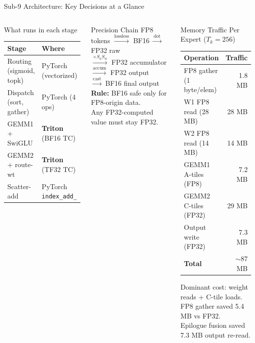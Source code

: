 \begin{frame}{Sub-9 Architecture: Key Decisions at a Glance}
\begin{columns}[T]
\begin{exampleblock}{What runs in each stage}
\small
\begin{tabular}{ll}
\toprule
\textbf{Stage} & \textbf{Where} \\
\midrule
Routing (sigmoid, topk) & PyTorch (vectorized) \\
Dispatch (sort, gather) & PyTorch (4 ops) \\
GEMM1 + SwiGLU & \textbf{Triton} (BF16 TC) \\
GEMM2 + route-wt & \textbf{Triton} (TF32 TC) \\
Scatter-add & PyTorch \texttt{index\_add\_} \\
\bottomrule
\end{tabular}
\end{exampleblock}

\begin{block}{\small Precision Chain}
\scriptsize
FP8 tokens $\xrightarrow{\text{lossless}}$ BF16 $\xrightarrow{\text{dot}}$ FP32 raw\\
$\xrightarrow{\times S_a S_w}$ FP32 accumulator\\
$\xrightarrow{\text{accum}}$ FP32 output\\
$\xrightarrow{\text{cast}}$ BF16 final output\\[3pt]
\textbf{Rule:} BF16 safe only for FP8-origin data.\\
Any FP32-computed value must stay FP32.
\end{block}

\begin{block}{\small Memory Traffic Per Expert ($T_k=256$)}
\scriptsize
\begin{tabular}{lr}
\toprule
\textbf{Operation} & \textbf{Traffic} \\
\midrule
FP8 gather (1 byte/elem) & 1.8 MB \\
W1 FP8 read (28 MB) & 28 MB \\
W2 FP8 read (14 MB) & 14 MB \\
GEMM1 A-tiles (FP8) & 7.2 MB \\
GEMM2 C-tiles (FP32) & 29 MB \\
Output write (FP32) & 7.3 MB \\
\midrule
\textbf{Total} & $\sim$87 MB \\
\bottomrule
\end{tabular}
\smallskip

Dominant cost: weight reads + C-tile loads.\\
FP8 gather saved 5.4 MB vs FP32.\\
Epilogue fusion saved 7.3 MB output re-read.
\end{block}
\end{columns}
\end{frame}

